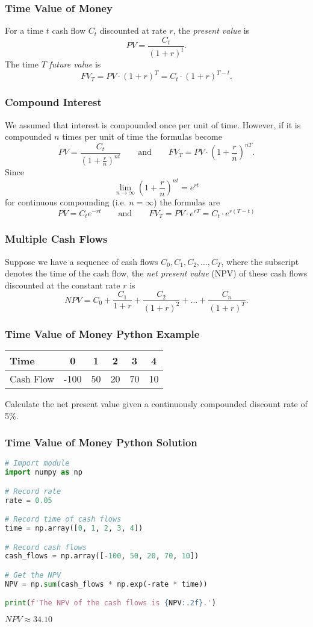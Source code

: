 \documentclass{beamer}
\begin{document}
\begin{frame}
\frametitle{Time Value of Money}

For a time $t$ cash flow $C_t$ discounted at rate $r$, the {\it present value} is
$$
PV = \frac{C_t}{(1 + r)^t}.
$$
The time $T$ {\it future value} is
$$
FV_T = PV\cdot (1 + r)^T = C_t\cdot (1 + r)^{T- t}.
$$
\end{frame}

\begin{frame}
\frametitle{Compound Interest}
\small 
We assumed that interest is compounded once per unit of time. However, if it is compounded $n$ times per unit of time the formulas become
$$
PV = \frac{C_t}{\left(1 + \frac{r}{n}\right)^{nt}}\qquad\text{and}\qquad FV_T = PV\cdot \left(1 + \frac{r}{n}\right)^{nT}.
$$
Since
$$
\lim_{n\to\infty} \left(1 + \frac{r}{n}\right)^{nt} = e^{rt}
$$
for continuous compounding (i.e. $n = \infty$) the formulas are
$$
PV = C_t e^{-rt} \qquad\text{and}\qquad FV_T = PV\cdot  e^{rT} = C_t\cdot  e^{r(T - t)}
$$
\end{frame}

\begin{frame}
\frametitle{Multiple Cash Flows} 
Suppose we have a sequence of cash flows $C_0, C_1, C_2,\ldots, C_T$, where the subscript denotes the time of the cash flow, the {\it net present value} (NPV) of these cash flows discounted at the constant rate $r$ is
$$
NPV = C_0 + \frac{C_1}{1 + r} + \frac{C_2}{(1 + r)^2} + \ldots + \frac{C_n}{(1 + r)^T}.
$$
\end{frame}

\begin{frame}[t]
\frametitle{Time Value of Money Python Example}
\small
\begin{Example}
\begin{center}
\begin{tabular}{| l | c c c c c |}
\hline
Time			&	0		&	1	&	2	&	3	&	4\\\hline
Cash Flow	&	-100		&	50	&	20	&	70	&	10\\\hline
\end{tabular}
\end{center}
Calculate the net present value given a continuously compounded discount rate of 5\%.
\end{Example}
\end{frame}

\begin{frame}[fragile]
\frametitle{Time Value of Money Python Solution}
\begin{lstlisting}[language=Python]
# Import module
import numpy as np

# Record rate
rate = 0.05

# Record time of cash flows
time = np.array([0, 1, 2, 3, 4])

# Record cash flows
cash_flows = np.array([-100, 50, 20, 70, 10])

# Get the NPV
NPV = np.sum(cash_flows * np.exp(-rate * time))

print(f'The NPV of the cash flows is {NPV:.2f}.')
\end{lstlisting}

$NPV \approx 34.10$
\end{frame}
\end{document}
